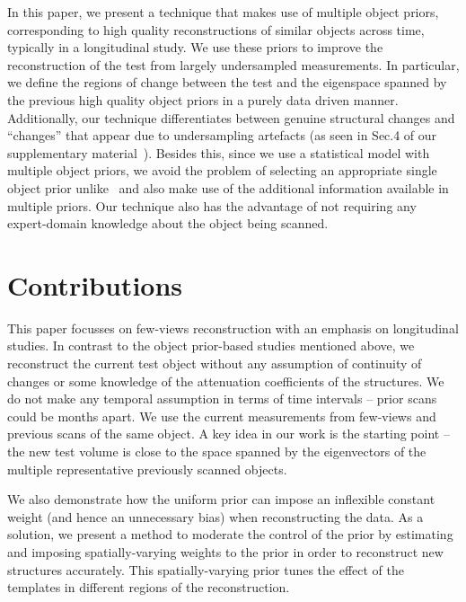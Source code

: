 \documentclass[journal]{IEEEtran}
\begin{document}
In this paper, we present a technique that makes use of multiple
object priors, corresponding to high quality reconstructions of
similar objects across time, typically in a longitudinal study.
We use these priors to improve the
reconstruction of the test from largely undersampled measurements. In
particular, we define the regions of change between the test and the
eigenspace spanned by the previous high quality object priors in a
purely data driven manner. Additionally, our technique differentiates
between genuine structural changes and ``changes'' that appear due to
undersampling artefacts (as seen in Sec.4 of our supplementary
material~\cite{supp_paper}).  Besides this, since we use a statistical
model with multiple object priors, we avoid the problem of selecting
an appropriate single object prior
unlike~\cite{PICCS,Pourmorteza2015,Lee2012,pirple,Marjolein2016} and
also make use of the additional information available in multiple
priors. Our technique also has the advantage of not requiring any
expert-domain knowledge about the object being scanned.
 

\section{Contributions}
\label{sec:contributions}
This paper focusses on few-views reconstruction with an emphasis on
longitudinal studies. In contrast to
the object prior-based studies mentioned above, we
reconstruct the current test object without any assumption of
continuity of changes or some knowledge of the attenuation
coefficients of the structures. We do not make any temporal assumption
in terms of time intervals -- prior scans could be months apart. We
use the current measurements from few-views and previous scans of the
same object. A key idea in our work is the starting point -- the new
test volume is close to the space spanned by the eigenvectors of the
multiple representative previously scanned objects.


We also demonstrate how the uniform prior can impose an inflexible
constant weight (and hence an unnecessary bias) when reconstructing
the data. As a solution, we present a method to moderate the control
of the prior by estimating and imposing spatially-varying weights to
the prior in order to reconstruct new structures accurately. This
spatially-varying prior tunes the effect of the templates in different
regions of the reconstruction.
\end{document}
